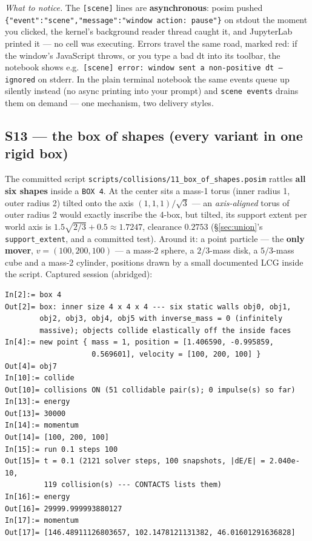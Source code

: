 \documentclass[11pt]{article}
\newcommand{\code}[1]{\texttt{#1}}
\begin{document}
\emph{What to notice.} The \code{[scene]} lines are
\textbf{asynchronous}: posim pushed
\code{\{"event":"scene","message":"window action: pause"\}} on stdout
the moment you clicked, the kernel's background reader thread caught
it, and JupyterLab printed it --- no cell was executing. Errors travel
the same road, marked red: if the window's JavaScript throws, or you
type a bad dt into its toolbar, the notebook shows e.g.\
\code{[scene] error: window sent a non-positive dt --- ignored} on
stderr. In the plain terminal notebook the same events queue up
silently instead (no async printing into your prompt) and
\code{scene events} drains them on demand --- one mechanism, two
delivery styles.

\subsection{S13 --- the box of shapes (every variant in one rigid box)}

The committed script
\code{scripts/collisions/11\_box\_of\_shapes.posim} rattles
\textbf{all six shapes} inside a \code{BOX 4}. At the center sits a
mass-1 torus (inner radius 1, outer radius 2) tilted onto the axis
$(1,1,1)/\sqrt3$ --- an \emph{axis-aligned} torus of outer radius 2
would exactly inscribe the 4-box, but tilted, its support extent per
world axis is $1.5\sqrt{2/3} + 0.5 \approx 1.7247$, clearance $0.2753$
(\S\ref{sec:union}'s \code{support\_extent}, and a committed test).
Around it: a point particle --- the \textbf{only mover},
$v = (100, 200, 100)$ --- a mass-2 sphere, a $2/3$-mass disk, a
$5/3$-mass cube and a mass-2 cylinder, positions drawn by a small
documented LCG inside the script. Captured session (abridged):

\begin{lstlisting}
In[2]:= box 4
Out[2]= box: inner size 4 x 4 x 4 --- six static walls obj0, obj1,
        obj2, obj3, obj4, obj5 with inverse_mass = 0 (infinitely
        massive); objects collide elastically off the inside faces
In[4]:= new point { mass = 1, position = [1.406590, -0.995859,
                    0.569601], velocity = [100, 200, 100] }
Out[4]= obj7
In[10]:= collide
Out[10]= collisions ON (51 collidable pair(s); 0 impulse(s) so far)
In[13]:= energy
Out[13]= 30000
In[14]:= momentum
Out[14]= [100, 200, 100]
In[15]:= run 0.1 steps 100
Out[15]= t = 0.1 (2121 solver steps, 100 snapshots, |dE/E| = 2.040e-10,
         119 collision(s) --- CONTACTS lists them)
In[16]:= energy
Out[16]= 29999.999993880127
In[17]:= momentum
Out[17]= [146.48911126803657, 102.1478121131382, 46.01601291636828]
\end{lstlisting}
\end{document}
